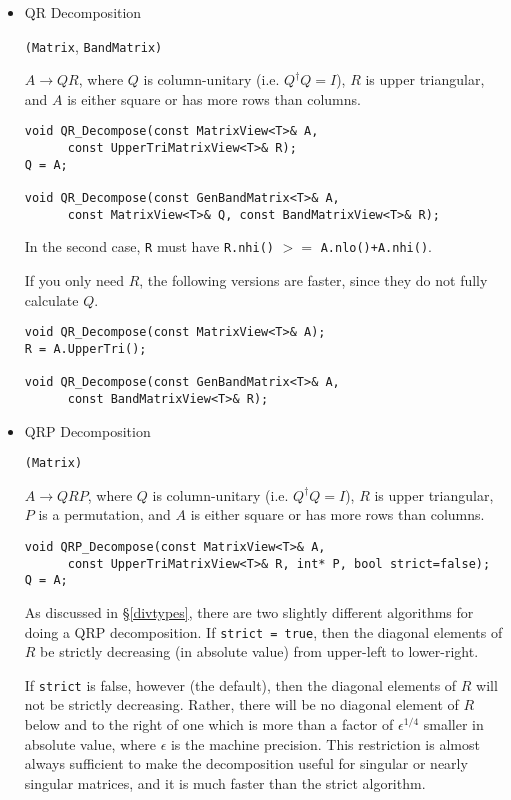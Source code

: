 \documentclass[twoside,letterpaper,11pt]{article}
\renewcommand{\tt}[1]{{\texttt {#1}}}
\begin{document}
\begin{itemize}
\item QR Decomposition 

\tt{(Matrix}, \tt{BandMatrix)}

$A \rightarrow Q R$, where $Q$ is column-unitary 
(i.e. $Q^\dagger Q = I$), $R$ is upper triangular, and $A$ is either square or 
has more rows than columns.

\begin{verbatim}
void QR_Decompose(const MatrixView<T>& A, 
      const UpperTriMatrixView<T>& R);
Q = A;

void QR_Decompose(const GenBandMatrix<T>& A, 
      const MatrixView<T>& Q, const BandMatrixView<T>& R);
\end{verbatim}
In the second case, \tt{R} must have \tt{R.nhi()} $>=$ \tt{A.nlo()+A.nhi()}.

If you only need $R$, the following versions are faster, since they do 
not fully calculate $Q$.
\begin{verbatim}
void QR_Decompose(const MatrixView<T>& A);
R = A.UpperTri();

void QR_Decompose(const GenBandMatrix<T>& A, 
      const BandMatrixView<T>& R);
\end{verbatim}

\item QRP Decomposition 

\tt{(Matrix)}

$A \rightarrow Q R P$, where $Q$ is column-unitary 
(i.e. $Q^\dagger Q = I$), $R$ is upper triangular, $P$ is a permutation, 
and $A$ is either square or has more rows than columns.

\begin{verbatim}
void QRP_Decompose(const MatrixView<T>& A, 
      const UpperTriMatrixView<T>& R, int* P, bool strict=false);
Q = A;
\end{verbatim}

As discussed in \S\ref{divtypes}, 
there are two slightly different algorithms for doing a QRP decomposition.  
If \tt{strict = true}, then the diagonal elements
of $R$ be strictly decreasing (in absolute value) from upper-left to lower-right.

If \tt{strict} is false, however (the default), then the diagonal elements of $R$ will not
be strictly decreasing.  Rather, there will be no diagonal element
of $R$ below and to the right of one which is more than a factor of $\epsilon^{1/4}$ 
smaller in absolute value, where 
$\epsilon$ is the machine precision.  This restriction
is almost always sufficient to make the decomposition useful for singular or nearly
singular matrices, and it is much faster than the strict algorithm.


\end{itemize}
\end{document}
